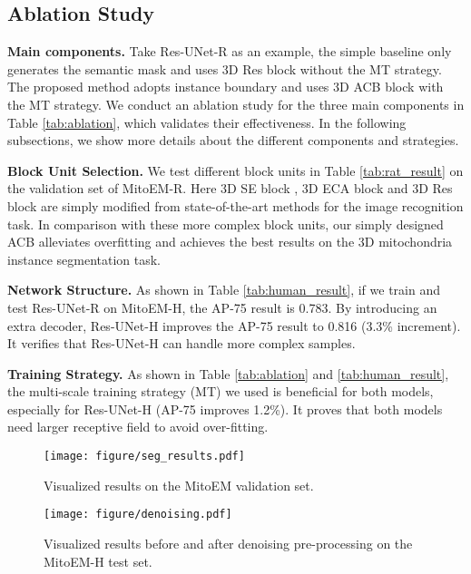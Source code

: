 \documentclass{article}
\begin{document}
\subsection{Ablation Study}
\textbf{Main components.} Take Res-UNet-R as an example, the simple baseline  only generates the semantic mask and uses 3D Res block  without the MT strategy. The proposed method  adopts instance boundary and  uses 3D ACB block  with the MT strategy. We conduct an ablation study for the three main components in Table \ref{tab:ablation}, which validates their effectiveness. 
In the following subsections, we show more details about the different components and strategies.

\textbf{Block Unit Selection.} We test different block units in Table \ref{tab:rat_result} on the validation set of MitoEM-R. Here 3D SE block \cite{hu2018squeeze}, 3D ECA block \cite{wang2020eca} and 3D Res block \cite{he2016deep} are simply modified from state-of-the-art methods for the image recognition task.  In comparison with these more complex block units, our simply designed ACB alleviates overfitting and achieves the best results on the 3D mitochondria instance  segmentation task.

\textbf{Network Structure.} As shown in Table \ref{tab:human_result}, if we train and test Res-UNet-R on MitoEM-H, the AP-75 result is 0.783. By introducing an extra decoder, Res-UNet-H improves the AP-75 result to 0.816 (3.3\% increment). It verifies that Res-UNet-H can  handle more complex samples.

\textbf{Training Strategy.} As shown in Table \ref{tab:ablation} and \ref{tab:human_result}, the multi-scale training strategy (MT) we used is beneficial for both models, especially for Res-UNet-H (AP-75 improves 1.2\%). It proves that both models need larger receptive field to avoid over-fitting.


 \begin{figure}[!t]
	\centering
	\texttt{[image: figure/seg\_results.pdf]}
	\vspace{-0.7cm}
	\caption{Visualized results on the MitoEM validation set.} \label{fig:seg_results}
	\vspace{-0.3cm}
\end{figure}



\begin{figure}[t]
	\centering
	\texttt{[image: figure/denoising.pdf]} \vspace{-0.7cm}
	\caption{Visualized results before and after denoising pre-processing on the MitoEM-H test set.} \label{fig:Denosing}
\end{figure}
\end{document}
